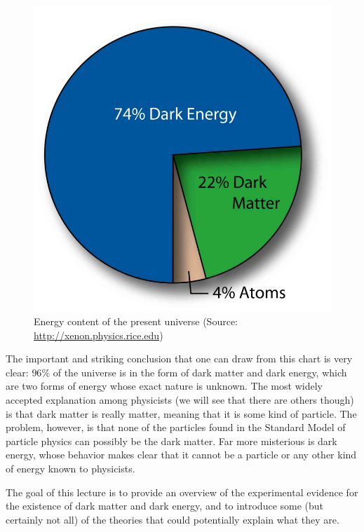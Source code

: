 \begin{figure}[ht]
\begin{center}
\includegraphics[scale=2]{Draw/lec10_1.png}
\end{center}
\caption{Energy content of the present universe (Source: \url{http://xenon.physics.rice.edu})}
\label{fig:lec10_1}
\end{figure}

The important and striking conclusion that one can draw from this chart is very clear: $96\%$ of the universe is in the form of dark matter and dark energy, which are two forms of energy whose exact nature is unknown. The most widely accepted explanation among physicists (we will see that there are others though) is that dark matter is really matter, meaning that it is some kind of particle. The problem, however, is that none of the particles found in the Standard Model of particle physics can possibly be the dark matter. Far more misterious is dark energy, whose behavior makes clear that it cannot be a particle or any other kind of energy known to physicists.

The goal of this lecture is to provide an overview of the experimental evidence for the existence of dark matter and dark energy, and to introduce some (but certainly not all) of the theories that could potentially explain what they are.


